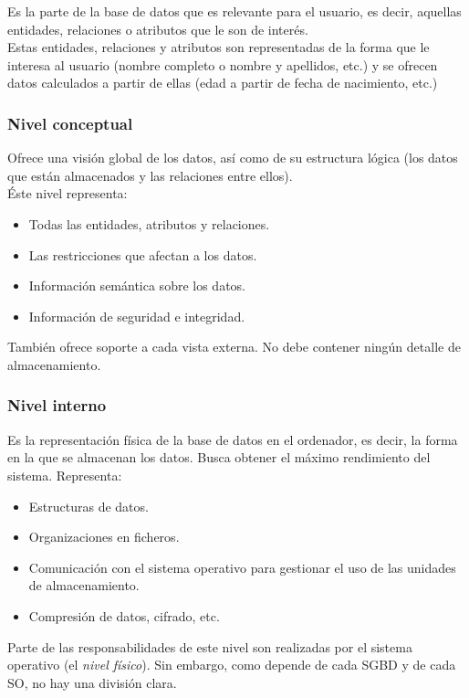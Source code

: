 \documentclass[12pt,spanish]{article}
\numberwithin{definition}{subsection}
\begin{document}
Es la parte de la base de datos que es relevante para el usuario, es decir, aquellas entidades, relaciones o atributos que le son de interés. \\
Estas entidades, relaciones y atributos son representadas de la forma que le interesa al usuario (nombre completo o nombre y apellidos, etc.) y se ofrecen datos calculados a partir de ellas (edad a partir de fecha de nacimiento, etc.)

\subsubsection{Nivel conceptual}

Ofrece una visión global de los datos, así como de su estructura lógica (los datos que están almacenados y las relaciones entre ellos).\\
Éste nivel representa:
\begin{itemize}
	\item Todas las entidades, atributos y relaciones.
	\item Las restricciones que afectan a los datos.
	\item Información semántica sobre los datos.
	\item Información de seguridad e integridad.
\end{itemize}

También ofrece soporte a cada vista externa. No debe contener ningún detalle de almacenamiento.

\subsubsection{Nivel interno}

Es la representación física de la base de datos en el ordenador, es decir, la forma en la que se almacenan los datos. Busca obtener el máximo rendimiento del sistema. Representa:

\begin{itemize}
	\item Estructuras de datos.
	\item Organizaciones en ficheros.
	\item Comunicación con el sistema operativo para gestionar el uso de las unidades de almacenamiento.
	\item Compresión de datos, cifrado, etc.
\end{itemize}

Parte de las responsabilidades de este nivel son realizadas por el sistema operativo (el \emph{nivel físico}). Sin embargo, como depende de cada SGBD y de cada SO, no hay una división clara.
\end{document}
